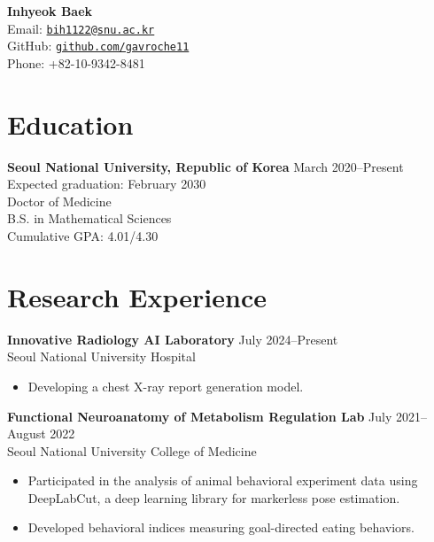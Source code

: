 \documentclass[11pt, a4paper]{article}
\newenvironment{customitemize}
	{\begin{itemize}[leftmargin=*, noitemsep, topsep=0pt, label=$\cdot$]}
	{\end{itemize}}
\begin{document}
\begin{center}
    \textbf{\Large Inhyeok Baek}\\
    \vspace{0.5mm}
    Email: \href{mailto:bih1122@snu.ac.kr}{\texttt{bih1122@snu.ac.kr}} \\
    GitHub: \href{https://github.com/gavroche11}{\texttt{github.com/gavroche11}} \\
    Phone: +82-10-9342-8481
\end{center}

\section*{Education}
\textbf{Seoul National University, Republic of Korea} \hfill March 2020--Present \\
\null\hfill {Expected graduation: February 2030}\smallskip \\
Doctor of Medicine\\
B.S. in Mathematical Sciences\\
Cumulative GPA: 4.01/4.30

\section*{Research Experience}
\textbf{Innovative Radiology AI Laboratory} \hfill July 2024--Present\\
Seoul National University Hospital \smallskip
\begin{customitemize}
    \item Developing a chest X-ray report generation model.
\end{customitemize}
\bigskip
\textbf{Functional Neuroanatomy of Metabolism Regulation Lab} \hfill July 2021--August 2022\\
Seoul National University College of Medicine \smallskip
\begin{customitemize}
    \item \sloppy Participated in the analysis of animal behavioral experiment data using DeepLabCut, a deep learning library for markerless pose estimation.
    \item Developed behavioral indices measuring goal-directed eating behaviors.
\end{customitemize}

\end{document}
